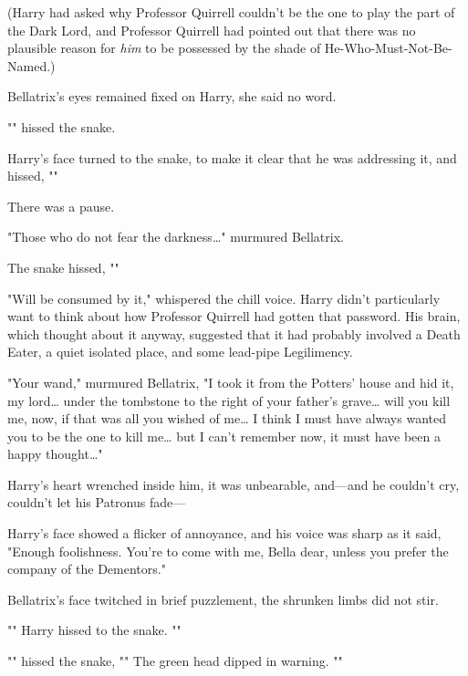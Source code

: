 (Harry had asked why Professor Quirrell couldn't be the one to play the part of 
the Dark Lord, and Professor Quirrell had pointed out that there was no 
plausible reason for \emph{him} to be possessed by the shade of 
He-Who-Must-Not-Be-Named.)

Bellatrix's eyes remained fixed on Harry, she said no word.

"" hissed the snake.

Harry's face turned to the snake, to make it clear that he was addressing it, 
and hissed, ""

There was a pause.

"Those who do not fear the darkness{\ldots}" murmured Bellatrix.

The snake hissed, ""

"Will be consumed by it," whispered the chill voice. Harry didn't particularly 
want to think about how Professor Quirrell had gotten that password. His brain, 
which thought about it anyway, suggested that it had probably involved a Death 
Eater, a quiet isolated place, and some lead-pipe Legilimency.

"Your wand," murmured Bellatrix, "I took it from the Potters' house and hid it, 
my lord{\ldots} under the tombstone to the right of your father's grave{\ldots} 
will you kill me, now, if that was all you wished of me{\ldots} I think I must 
have always wanted you to be the one to kill me{\ldots} but I can't remember 
now, it must have been a happy thought{\ldots}"

Harry's heart wrenched inside him, it was unbearable, and---and he couldn't 
cry, couldn't let his Patronus fade---

Harry's face showed a flicker of annoyance, and his voice was sharp as it said, 
"Enough foolishness. You're to come with me, Bella dear, unless you prefer the 
company of the Dementors."

Bellatrix's face twitched in brief puzzlement, the shrunken limbs did not stir.

"" Harry hissed to the snake. ""

"" hissed the snake, "" The green head dipped in warning. 
""

